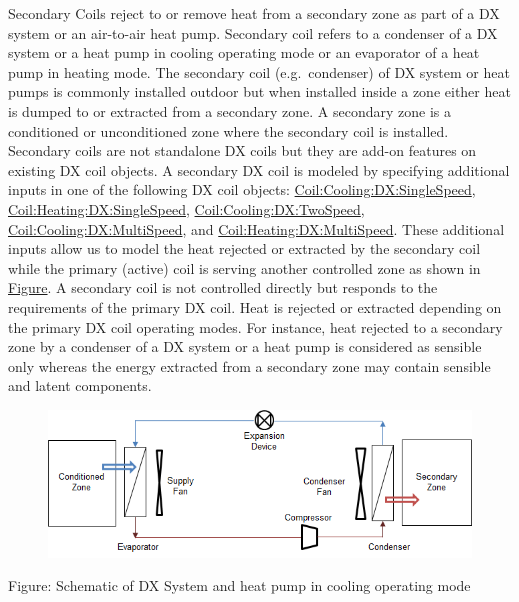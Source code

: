 Secondary Coils reject to or remove heat from a secondary zone as part of a DX system or an air-to-air heat pump. Secondary coil refers to a condenser of a DX system or a heat pump in cooling operating mode or an evaporator of a heat pump in heating mode. The secondary coil (e.g.~condenser) of DX system or heat pumps is commonly installed outdoor but when installed inside a zone either heat is dumped to or extracted from a secondary zone. A secondary zone is a conditioned or unconditioned zone where the secondary coil is installed. Secondary coils are not standalone DX coils but they are add-on features on existing DX coil objects. A secondary DX coil is modeled by specifying additional inputs in one of the following DX coil objects: \hyperref[coilcoolingdxsinglespeed]{Coil:Cooling:DX:SingleSpeed}, \hyperref[coilheatingdxsinglespeed]{Coil:Heating:DX:SingleSpeed}, \hyperref[coilcoolingdxtwospeed]{Coil:Cooling:DX:TwoSpeed}, \hyperref[coilcoolingdxmultispeed]{Coil:Cooling:DX:MultiSpeed}, and \hyperref[coilheatingdxmultispeed]{Coil:Heating:DX:MultiSpeed}. These additional inputs allow us to model the heat rejected or extracted by the secondary coil while the primary (active) coil is serving another controlled zone as shown in \protect\hyperlink{SecondaryCoilsFigure1}{Figure}. A secondary coil is not controlled directly but responds to the requirements of the primary DX coil. Heat is rejected or extracted depending on the primary DX coil operating modes. For instance, heat rejected to a secondary zone by a condenser of a DX system or a heat pump is considered as sensible only whereas the energy extracted from a secondary zone may contain sensible and latent components.

\begin{figure}[htbp]
\centering
\includegraphics{media/image903.png}
\caption{}
\end{figure}

Figure: Schematic of DX System and heat pump in cooling operating mode

